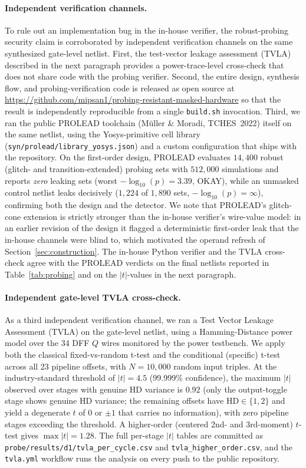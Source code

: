 \documentclass[lettersize,journal]{IEEEtran}
\begin{document}
\paragraph{Independent verification channels.}
To rule out an implementation bug in the in-house verifier, the
robust-probing security claim is corroborated by independent
verification channels on the same synthesized gate-level netlist.
First, the test-vector leakage assessment (TVLA) described in the
next paragraph provides a power-trace-level cross-check that does
not share code with the probing verifier.  Second, the entire
design, synthesis flow, and probing-verification code is released
as open source at
\url{https://github.com/mipsan1/probing-resistant-masked-hardware}
so that the result is independently reproducible from a single
\texttt{build.sh} invocation.  Third, we ran the public PROLEAD
toolchain (M\"uller \& Moradi, TCHES~2022) itself on the same
netlist, using the Yosys-primitive cell library
(\texttt{syn/prolead/library\_yosys.json}) and a custom
configuration that ships with the repository.  On the first-order
design, PROLEAD evaluates $14{,}400$ robust (glitch- and
transition-extended) probing sets with $512{,}000$ simulations and
reports \emph{zero} leaking sets (worst $-\log_{10}(p)=3.39$,
OKAY), while an unmasked control netlist leaks decisively
($1{,}224$ of $1{,}890$ sets, $-\log_{10}(p)=\infty$), confirming
both the design and the detector.  We note that PROLEAD's
glitch-cone extension is strictly stronger than the in-house
verifier's wire-value model: in an earlier revision of the design
it flagged a deterministic first-order leak that the in-house
channels were blind to, which motivated the operand refresh of
Section~\ref{sec:construction}.  The in-house Python verifier and
the TVLA cross-check agree with the PROLEAD verdicts on the
final netlists reported
in Table~\ref{tab:probing} and on the $|t|$-values in the next
paragraph.

\paragraph{Independent gate-level TVLA cross-check.}
As a third independent verification channel, we ran a Test Vector
Leakage Assessment (TVLA) on the gate-level netlist, using a
Hamming-Distance power model over the 34 DFF $Q$ wires
monitored by the power testbench.  We apply both the
classical fixed-vs-random t-test and the conditional (specific)
t-test across all 23 pipeline offsets, with $N{=}10{,}000$ random
input triples.  At the industry-standard threshold of
$|t|{=}4.5$ (99.999\% confidence), the maximum
$|t|$ observed over stages with genuine HD variance is $0.92$
(only the output-toggle stage shows genuine HD variance; the
remaining offsets have $\mathrm{HD}\in\{1,2\}$ and yield a
degenerate $t$ of $0$ or $\pm1$ that carries no information), with
zero pipeline stages exceeding the threshold.  A
higher-order (centered 2nd- and 3rd-moment) $t$-test gives
$\max|t|=1.28$.  The full per-stage
$|t|$ tables are
committed as \texttt{probe/results/d1/tvla\_per\_cycle.csv} and
\texttt{tvla\_higher\_order.csv}, and the
\texttt{tvla.yml} workflow runs the analysis on every push to
the public repository.
\end{document}
